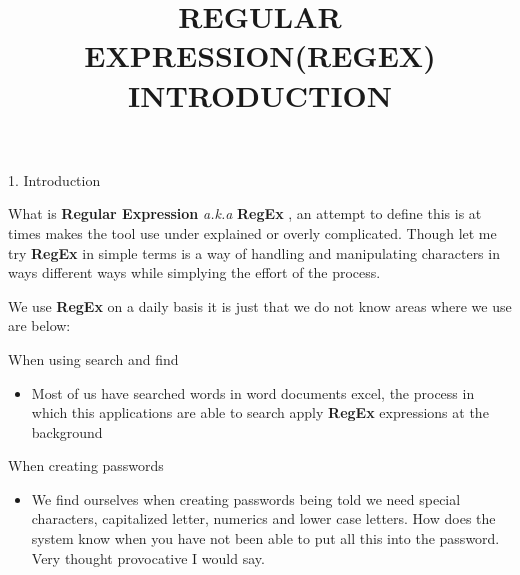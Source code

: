 \documentclass[ignorenonframetext,]{beamer}
\title{REGULAR EXPRESSION(REGEX) INTRODUCTION}
\date{}
\providecommand{\tightlist}{%
  \setlength{\itemsep}{0pt}\setlength{\parskip}{0pt}}
\begin{document}
\frame{\titlepage}

\begin{frame}{1. Introduction}
\protect\hypertarget{introduction}{}

What is \textbf{Regular Expression} \emph{a.k.a} \textbf{RegEx} , an
attempt to define this is at times makes the tool use under explained or
overly complicated. Though let me try \textbf{RegEx} in simple terms is
a way of handling and manipulating characters in ways different ways
while simplying the effort of the process.

\end{frame}

\begin{frame}

We use \textbf{RegEx} on a daily basis it is just that we do not know
areas where we use are below:

When using search and find

\begin{itemize}
\tightlist
\item
  Most of us have searched words in word documents excel, the process in
  which this applications are able to search apply \textbf{RegEx}
  expressions at the background
\end{itemize}

When creating passwords

\begin{itemize}
\tightlist
\item
  We find ourselves when creating passwords being told we need special
  characters, capitalized letter, numerics and lower case letters. How
  does the system know when you have not been able to put all this into
  the password. Very thought provocative I would say.
\end{itemize}

\end{frame}
\end{document}
